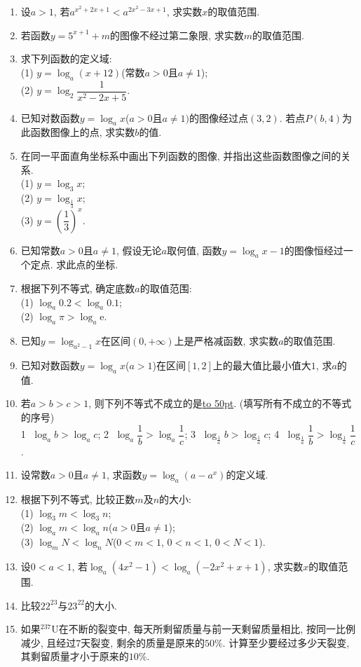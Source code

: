 \documentclass[10pt,a4paper]{article}
\newcommand{\blank}[1]{\underline{\hbox to #1pt{}}}
\begin{document}
\begin{enumerate}[1.]
\item 设$a>1$, 若$a^{x^2+2x+1}<a^{2x^2-3x+1}$, 求实数$x$的取值范围.
\item 若函数$y=5^{x+1}+m$的图像不经过第二象限, 求实数$m$的取值范围. 
\item 求下列函数的定义域:\\
(1) $y=\log_a (x+12)$(常数$a>0$且$a\ne 1$);\\
(2) $y=\log_2\dfrac1{x^2-2x+5}$.
\item 已知对数函数$y=\log_ax$($a>0$且$a\ne 1)$的图像经过点$(3, 2)$. 若点$P(b, 4)$为此函数图像上的点, 求实数$b$的值.
\item 在同一平面直角坐标系中画出下列函数的图像, 并指出这些函数图像之间的关系.\\
(1) $y=\log_3x$;\\
(2) $y=\log_{\frac 13}x$;\\
(3) $y=(\dfrac 13)^x$.
\item 已知常数$a>0$且$a\ne 1$, 假设无论$a$取何值, 函数$y=\log_ax-1$的图像恒经过一个定点. 求此点的坐标.
\item 根据下列不等式, 确定底数$a$的取值范围:\\
(1) $\log_a 0.2<\log_a 0.1$;\\
(2) $\log_a\pi >\log_a\mathrm{e}$.
\item 已知$y=\log_{a^2-1}x$在区间$(0, +\infty)$上是严格减函数, 求实数$a$的取值范围.
\item 已知对数函数$y=\log_ax$($a>1$)在区间$[1, 2]$上的最大值比最小值大$1$, 求$a$的值.
\item 若$a>b>c>1$, 则下列不等式不成立的是\blank{50}. (填写所有不成立的不等式的序号)\\
\textcircled{1} $\log_ab>\log_ac$; \textcircled{2} $\log_a\dfrac 1b>\log_a\dfrac 1c$; \textcircled{3} $\log_{\frac 1a}b>\log_{\frac 1a}c$; \textcircled{4} $\log_{\frac 1a}\dfrac 1b>\log_{\frac 1a}\dfrac 1c$.
\item 设常数$a>0$且$a\ne 1$, 求函数$y=\log_a(a-a^x)$的定义域.
\item 根据下列不等式, 比较正数$m$及$n$的大小:\\
(1) $\log_3m<\log_3n$;\\
(2) $\log_am<\log_an$($a>0$且$a\ne 1$);\\
(3) $\log_mN<\log_nN$($0<m<1$, $0<n<1$, $0<N<1$).
\item 设$0<a<1$, 若$\log_a(4x^2-1)<\log_a(-2x^2+x+1)$, 求实数$x$的取值范围.
\item 比较$22^{23}$与$23^{22}$的大小.
\item 如果$^{237}\text{U}$在不断的裂变中, 每天所剩留质量与前一天剩留质量相比, 按同一比例减少, 且经过$7$天裂变, 剩余的质量是原来的$50\%$. 计算至少要经过多少天裂变, 其剩留质量才小于原来的$10\%$. 

\end{enumerate}
\end{document}
